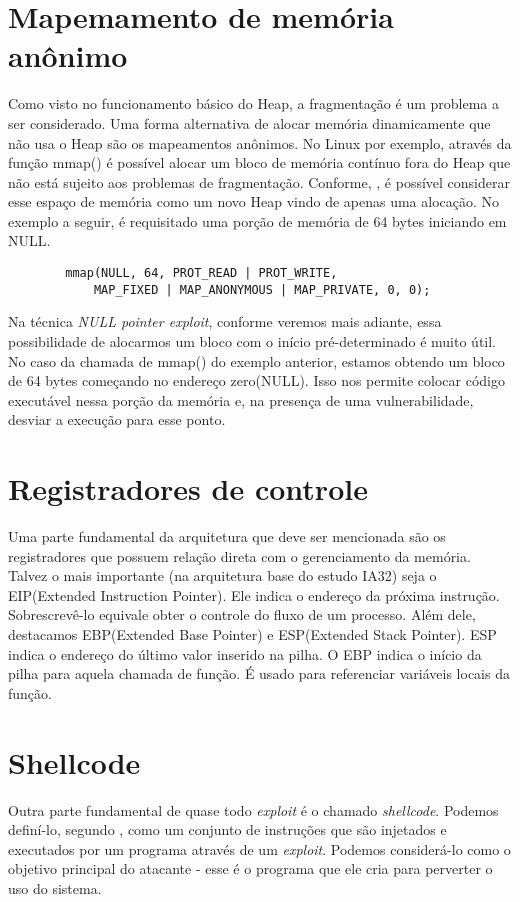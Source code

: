 	\section{Mapemamento de memória anônimo}
	Como visto no funcionamento básico do Heap, a fragmentação é um problema a ser considerado.
	Uma forma alternativa de alocar memória dinamicamente que não usa o Heap são os mapeamentos anônimos.
	No Linux por exemplo, através da função mmap() é possível alocar um bloco de memória contínuo
	fora do Heap que não está sujeito aos problemas de fragmentação.
	Conforme, \cite{Love2007}, é possível considerar esse espaço de memória como um novo Heap
	vindo de apenas uma alocação.
	No exemplo a seguir, é requisitado uma porção de memória de 64 bytes iniciando em NULL.
	\begin{verbatim}
		mmap(NULL, 64, PROT_READ | PROT_WRITE,
			MAP_FIXED | MAP_ANONYMOUS | MAP_PRIVATE, 0, 0);
	\end{verbatim}
	Na técnica \textsl{NULL pointer exploit}, conforme veremos mais adiante, essa possibilidade
	de alocarmos um bloco com o início pré-determinado é muito útil.
	No caso da chamada de mmap() do exemplo anterior, estamos obtendo um bloco de 64 bytes começando
	no endereço zero(NULL). Isso nos permite colocar código executável nessa porção da memória e,
	na presença de uma vulnerabilidade, desviar a execução para esse ponto.
	
	\section{Registradores de controle}
	Uma parte fundamental da arquitetura que deve ser mencionada são os registradores que possuem
	relação direta com o gerenciamento da memória.
	Talvez o mais importante (na arquitetura base do estudo IA32) seja o EIP(Extended Instruction Pointer).
	Ele indica o endereço da próxima instrução. Sobrescrevê-lo equivale obter o controle
	do fluxo de um processo.
	Além dele, destacamos EBP(Extended Base Pointer) e ESP(Extended Stack Pointer).
	ESP indica o endereço do último valor inserido na pilha.
	O EBP indica o início da pilha para aquela chamada de função. É usado para referenciar variáveis
	locais da função.

	\section{Shellcode}
	Outra parte fundamental de quase todo \textsl{exploit} é o chamado \textsl{shellcode}.
	Podemos definí-lo, segundo \cite{Anley2007}, como um conjunto de instruções que são injetados
	e executados por um programa através de um \textsl{exploit}. 
	Podemos considerá-lo como o objetivo principal do atacante - esse é o programa que ele cria
	para perverter o uso do sistema.
	
